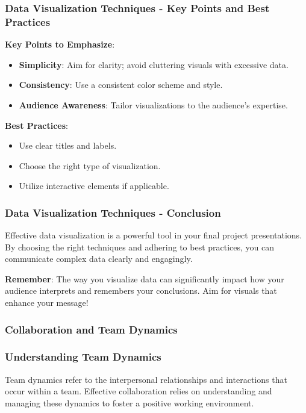 \documentclass{beamer}
\begin{document}
\begin{frame}[fragile]
    \frametitle{Data Visualization Techniques - Key Points and Best Practices}
    \textbf{Key Points to Emphasize}:
    \begin{itemize}
        \item \textbf{Simplicity}: Aim for clarity; avoid cluttering visuals with excessive data.
        \item \textbf{Consistency}: Use a consistent color scheme and style.
        \item \textbf{Audience Awareness}: Tailor visualizations to the audience's expertise.
    \end{itemize}

    \textbf{Best Practices}:
    \begin{itemize}
        \item Use clear titles and labels.
        \item Choose the right type of visualization.
        \item Utilize interactive elements if applicable.
    \end{itemize}
\end{frame}

\begin{frame}[fragile]
    \frametitle{Data Visualization Techniques - Conclusion}
    Effective data visualization is a powerful tool in your final project presentations. By choosing the right techniques and adhering to best practices, you can communicate complex data clearly and engagingly.

    \textbf{Remember}: The way you visualize data can significantly impact how your audience interprets and remembers your conclusions. Aim for visuals that enhance your message!
\end{frame}

\begin{frame}[fragile]
    \frametitle{Collaboration and Team Dynamics}
\end{frame}

\begin{frame}[fragile]
    \frametitle{Understanding Team Dynamics}
    Team dynamics refer to the interpersonal relationships and interactions that occur within a team. Effective collaboration relies on understanding and managing these dynamics to foster a positive working environment.
\end{frame}
\end{document}
